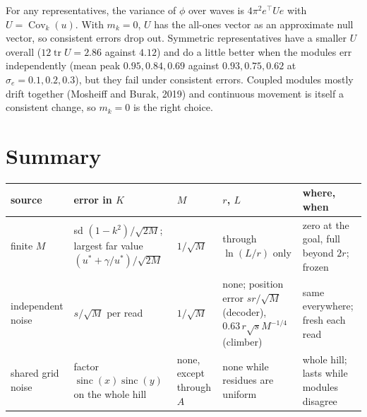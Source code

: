 \documentclass[11pt]{article}
\newcommand{\Cov}{\operatorname{Cov}}
\newcommand{\sinc}{\operatorname{sinc}}
\begin{document}
For any representatives, the variance of $\phi$ over waves is $4\pi^2 e^\top U e$ with
$U = \Cov_k(u)$. With $m_k = 0$, $U$ has the all-ones vector as an approximate null vector, so
consistent errors drop out. Symmetric representatives have a smaller $U$ overall ($12\operatorname{tr}U
= 2.86$ against $4.12$) and do a little better when the modules err independently (mean peak
$0.95, 0.84, 0.69$ against $0.93, 0.75, 0.62$ at $\sigma_e = 0.1, 0.2, 0.3$), but they fail
under consistent errors. Coupled modules mostly drift together (Mosheiff and Burak, 2019) and
continuous movement is itself a consistent change, so $m_k = 0$ is the right choice.

\section{Summary}

\begin{center}
\small
\begin{tabular}{p{2.3cm}p{4.2cm}p{1.6cm}p{2.6cm}p{2.4cm}}
  \toprule
  source & error in $K$ & $M$ & $r$, $L$ & where, when \\
  \midrule
  finite $M$ &
  sd $(1 - k^2)/\sqrt{2M}$; largest far value $(u^* + \gamma/u^*)/\sqrt{2M}$ &
  $1/\sqrt{M}$ &
  through $\ln(L/r)$ only &
  zero at the goal, full beyond $2r$; frozen \\[4pt]
  independent noise &
  $s/\sqrt{M}$ per read &
  $1/\sqrt{M}$ &
  none; position error $s r/\sqrt{M}$ (decoder), $0.63\,r\sqrt{s}M^{-1/4}$ (climber) &
  same everywhere; fresh each read \\[4pt]
  shared grid noise &
  factor $\sinc(x)\sinc(y)$ on the whole hill &
  none, except through $A$ &
  none while residues are uniform &
  whole hill; lasts while modules disagree \\
  \bottomrule
\end{tabular}
\end{center}
\end{document}
